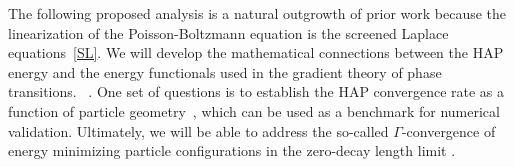 The following proposed analysis is
a natural outgrowth of prior work because the linearization of the
Poisson-Boltzmann equation is the screened Laplace equations~\eqref{SL}.
We will develop the mathematical connections between the HAP energy and
the energy functionals used in the gradient theory of phase transitions.
~\cite{Modica87, MODICA1987487, LuMo89}. 
%
%
One set of questions is to establish the HAP convergence rate as a
function of particle geometry~\cite{LuMo89}, which can be used as a
benchmark for numerical validation.
Ultimately, we will be able to address the so-called $\Gamma$-convergence of energy minimizing
particle configurations in the zero-decay length limit \cite{Roger2006, Mugnai2013}. 
%
%
